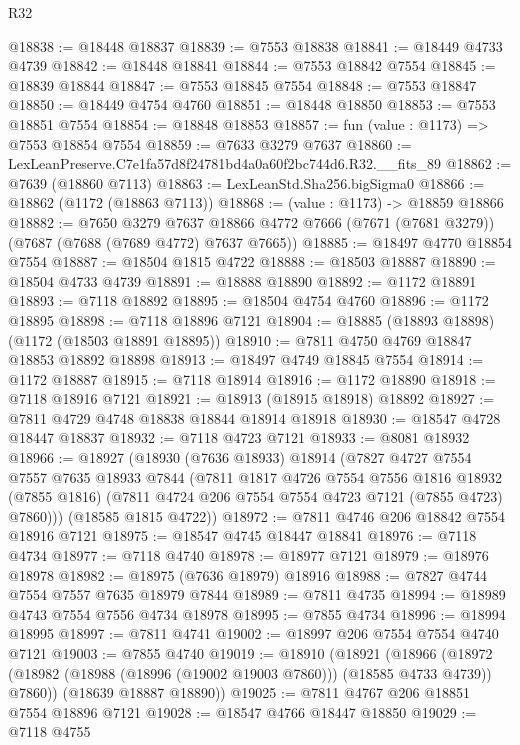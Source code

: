 \begin{lexlean}{R32}
\begin{coremodule}
@18838 := @18448 @18837
@18839 := @7553 @18838
@18841 := @18449 @4733 @4739
@18842 := @18448 @18841
@18844 := @7553 @18842 @7554
@18845 := @18839 @18844
@18847 := @7553 @18845 @7554
@18848 := @7553 @18847
@18850 := @18449 @4754 @4760
@18851 := @18448 @18850
@18853 := @7553 @18851 @7554
@18854 := @18848 @18853
@18857 := fun (value : @1173) => @7553 @18854 @7554
@18859 := @7633 @3279 @7637
@18860 := LexLeanPreserve.C7e1fa57d8f24781bd4a0a60f2bc744d6.R32.__fits_89
@18862 := @7639 (@18860 @7113)
@18863 := LexLeanStd.Sha256.bigSigma0
@18866 := @18862 (@1172 (@18863 @7113))
@18868 := (value : @1173) -> @18859 @18866
@18882 := @7650
    @3279
    @7637
    @18866
    @4772
    @7666
    (@7671 (@7681 @3279))
    (@7687 (@7688 (@7689 @4772) @7637 @7665))
@18885 := @18497 @4770 @18854 @7554
@18887 := @18504 @1815 @4722
@18888 := @18503 @18887
@18890 := @18504 @4733 @4739
@18891 := @18888 @18890
@18892 := @1172 @18891
@18893 := @7118 @18892
@18895 := @18504 @4754 @4760
@18896 := @1172 @18895
@18898 := @7118 @18896 @7121
@18904 := @18885 (@18893 @18898) (@1172 (@18503 @18891 @18895))
@18910 := @7811 @4750 @4769 @18847 @18853 @18892 @18898
@18913 := @18497 @4749 @18845 @7554
@18914 := @1172 @18887
@18915 := @7118 @18914
@18916 := @1172 @18890
@18918 := @7118 @18916 @7121
@18921 := @18913 (@18915 @18918) @18892
@18927 := @7811 @4729 @4748 @18838 @18844 @18914 @18918
@18930 := @18547 @4728 @18447 @18837
@18932 := @7118 @4723 @7121
@18933 := @8081 @18932
@18966 := @18927
    (@18930
      (@7636 @18933)
      @18914
      (@7827
        @4727
        @7554
        @7557
        @7635
        @18933
        @7844
        (@7811
          @1817
          @4726
          @7554
          @7556
          @1816
          @18932
          (@7855 @1816)
          (@7811 @4724 @206 @7554 @7554 @4723 @7121 (@7855 @4723) @7860)))
      (@18585 @1815 @4722))
@18972 := @7811 @4746 @206 @18842 @7554 @18916 @7121
@18975 := @18547 @4745 @18447 @18841
@18976 := @7118 @4734
@18977 := @7118 @4740
@18978 := @18977 @7121
@18979 := @18976 @18978
@18982 := @18975 (@7636 @18979) @18916
@18988 := @7827 @4744 @7554 @7557 @7635 @18979 @7844
@18989 := @7811 @4735
@18994 := @18989 @4743 @7554 @7556 @4734 @18978
@18995 := @7855 @4734
@18996 := @18994 @18995
@18997 := @7811 @4741
@19002 := @18997 @206 @7554 @7554 @4740 @7121
@19003 := @7855 @4740
@19019 := @18910
    (@18921
      (@18966 (@18972 (@18982 (@18988 (@18996 (@19002 @19003 @7860))) (@18585 @4733 @4739)) @7860))
      (@18639 @18887 @18890))
@19025 := @7811 @4767 @206 @18851 @7554 @18896 @7121
@19028 := @18547 @4766 @18447 @18850
@19029 := @7118 @4755

\end{coremodule}
\end{lexlean}
